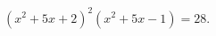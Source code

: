 \begin{ex}[type=equation]
	\begin{condition}
		$\left(x^2 +5x + 2\right)^2 \left(x^2 +5x - 1\right)  = 28.$
	\end{condition}
\end{ex}